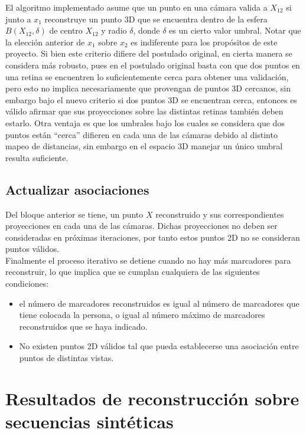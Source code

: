 El algoritmo implementado asume que un punto en una cámara valida a $X_{12}$ si junto a $x_1$ reconstruye un punto 3D que se encuentra dentro de la esfera $B(X_{12}, \delta)$ de centro $X_{12}$ y radio $\delta$, donde $\delta$ es un cierto valor umbral. Notar que la elección anterior de $x_1$ sobre $x_2$ es indiferente para los propósitos de este proyecto. Si bien este criterio difiere del postulado original, en cierta manera se considera más robusto, pues en el postulado original basta con que dos puntos en una retina se encuentren lo suficientemente cerca para obtener una validación, pero esto no implica necesariamente que provengan de puntos 3D cercanos, sin embargo bajo el nuevo criterio si dos puntos 3D se encuentran cerca, entonces es válido afirmar que sus proyecciones sobre las distintas retinas también deben estarlo. Otra ventaja es que los umbrales bajo los cuales se considera que dos puntos están ``cerca'' difieren en cada una de las cámaras debido al distinto mapeo de distancias, sin embargo en el espacio 3D manejar un único umbral resulta suficiente.       

\subsection{Actualizar asociaciones}\label{actualizar_asociaciones}

Del bloque anterior se tiene, un punto $X$ reconstruido y sus correspondientes proyecciones en cada una de las cámaras. Dichas proyecciones no deben ser consideradas en próximas iteraciones, por tanto estos puntos 2D no se consideran puntos válidos.\\



Finalmente el proceso iterativo se detiene cuando no hay más marcadores para reconstruir, lo que implica que se cumplan cualquiera de las siguientes condiciones:\\
\begin{itemize}
\item el número de marcadores reconstruidos es igual al número de marcadores que tiene colocada la persona, o igual al número máximo de marcadores  reconstruidos que se haya indicado.

\item No existen puntos 2D válidos tal que pueda establecerse una asociación entre puntos de distintas vistas.
\end{itemize}




\section{Resultados de reconstrucción sobre secuencias sintéticas}

